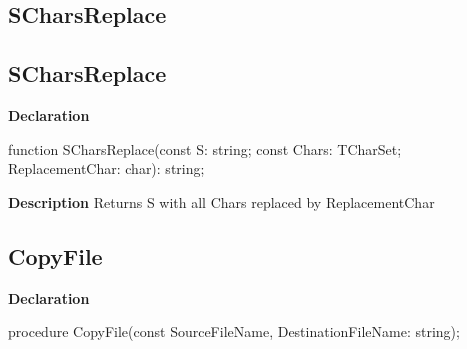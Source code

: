 \documentclass{report}
\newif\ifpdf
\begin{document}
\subsection*{\large{\textbf{SCharsReplace}}\normalsize\hspace{1ex}\hrulefill}
\else
\subsection*{SCharsReplace}
\fi
\label{PasDoc_Utils-SCharsReplace}
\begin{list}{}{
\setlength{\itemindent}{0cm}
\setlength{\listparindent}{0cm}
\setlength{\leftmargin}{\evensidemargin}
\addtolength{\leftmargin}{\tmplength}
\settowidth{\labelsep}{X}
\addtolength{\leftmargin}{\labelsep}
\setlength{\labelwidth}{\tmplength}
}
\item[\textbf{Declaration}\hfill]
\ifpdf
\begin{flushleft}
\fi
\begin{ttfamily}
function SCharsReplace(const S: string; const Chars: TCharSet; ReplacementChar: char): string;\end{ttfamily}

\ifpdf
\end{flushleft}
\fi

\par
\item[\textbf{Description}]
Returns S with all Chars replaced by ReplacementChar

\end{list}
\ifpdf
\subsection*{\large{\textbf{CopyFile}}\normalsize\hspace{1ex}\hrulefill}
\else
\subsection*{CopyFile}
\fi
\label{PasDoc_Utils-CopyFile}
\begin{list}{}{
\setlength{\itemindent}{0cm}
\setlength{\listparindent}{0cm}
\setlength{\leftmargin}{\evensidemargin}
\addtolength{\leftmargin}{\tmplength}
\settowidth{\labelsep}{X}
\addtolength{\leftmargin}{\labelsep}
\setlength{\labelwidth}{\tmplength}
}
\item[\textbf{Declaration}\hfill]
\ifpdf
\begin{flushleft}
\fi
\begin{ttfamily}
procedure CopyFile(const SourceFileName, DestinationFileName: string);\end{ttfamily}

\ifpdf
\end{flushleft}
\fi

\end{list}
\ifpdf
\end{document}
